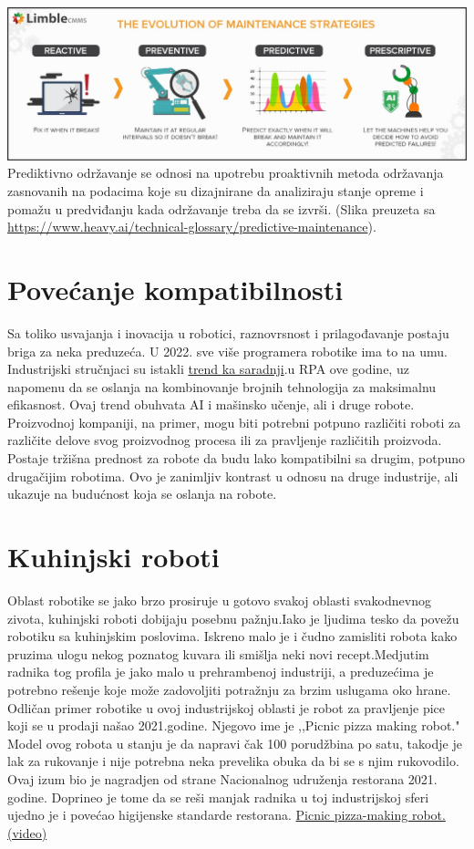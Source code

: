 \documentclass{report}
\begin{document}
	
	\centering
	\vspace{2cm}
	\includegraphics[scale=0.37]{dijagram.jpeg}
	Prediktivno održavanje se odnosi na upotrebu proaktivnih metoda održavanja zasnovanih na podacima koje su dizajnirane da analiziraju stanje opreme i pomažu u predviđanju kada održavanje treba da se izvrši. (Slika preuzeta sa \url{https://www.heavy.ai/technical-glossary/predictive-maintenance}).
	
	\chapter{Povećanje kompatibilnosti}
	Sa toliko usvajanja i inovacija u robotici, raznovrsnost i prilagođavanje postaju briga za neka preduzeća. U 2022. sve više programera robotike ima to na umu. Industrijski stručnjaci su istakli
	\href{https://enterprisersproject.com/article/2022/1/4-robotic-process-automation-rpa-trends-watch-2022}{trend ka saradnji}.u RPA ove godine, uz napomenu da se oslanja na kombinovanje brojnih tehnologija za maksimalnu efikasnost.
	Ovaj trend obuhvata AI i mašinsko učenje, ali i druge robote. Proizvodnoj kompaniji, na primer, mogu biti potrebni potpuno različiti roboti za različite delove svog proizvodnog procesa ili za pravljenje različitih proizvoda. Postaje tržišna prednost za robote da budu lako kompatibilni sa drugim, potpuno drugačijim robotima. Ovo je zanimljiv kontrast u odnosu na druge industrije, ali ukazuje na budućnost koja se oslanja na robote.
	\cite{robotics2022}
\chapter{Kuhinjski roboti}
Oblast robotike se jako brzo prosiruje u gotovo svakoj oblasti svakodnevnog zivota, kuhinjski roboti dobijaju posebnu pažnju.Iako je ljudima tesko da povežu robotiku sa kuhinjskim poslovima. Iskreno malo je i čudno zamisliti robota kako pruzima ulogu nekog poznatog kuvara ili smišlja neki novi recept.Medjutim radnika tog profila je jako malo u prehrambenoj industriji, a preduzećima je potrebno rešenje koje može zadovoljiti potražnju za brzim uslugama oko hrane. Odličan primer robotike u ovoj industrijskoj oblasti je robot za pravljenje pice koji se u prodaji našao 2021.godine. Njegovo ime je ,,Picnic pizza making robot." Model ovog robota u stanju je da napravi čak 100 porudžbina po satu, takodje je lak za rukovanje i nije potrebna neka prevelika obuka da bi se s njim rukovodilo. Ovaj izum bio je nagradjen od strane Nacionalnog udruženja restorana 2021. godine. Doprineo je tome da se reši manjak radnika u toj industrijskoj sferi ujedno je i povećao higijenske standarde restorana.
\href{https://www.youtube.com/embed/_dCC96BOlDU}{Picnic pizza-making robot. (video)}
\end{document}

